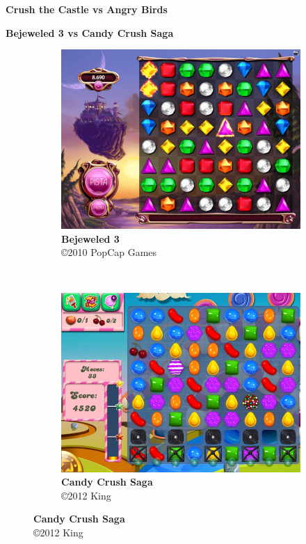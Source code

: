 \expandafter\documentclass\expandafter[table, usenames, svgnames, dvipsnames, \classopts]{beamer}
\begin{document}
\begin{frame}{\textbf{Crush the Castle vs Angry Birds}}

\end{frame}

\begin{frame}{\textbf{Bejeweled 3 vs Candy Crush Saga}}

	\begin{figure}
	    \centering

	    \begin{subfigure}[!h]{0.4\paperwidth}
	    	\centering
	    	\includegraphics[height=0.4\paperheight]{bejeweled-screenshot}
	        \caption{\scriptsize\textbf{Bejeweled 3}\\\copyright{2010} PopCap Games\footnotemark{}}
	    \end{subfigure}
	    ~
		\begin{subfigure}[!h]{0.4\paperwidth}
			\centering
	        \includegraphics[height=0.4\paperheight]{candy-crush-screenshot}
	        \caption{\scriptsize\textbf{Candy Crush Saga}\\\copyright{2012} King\footnotemark{}}
	    \end{subfigure}
    \end{figure}


\end{frame}
\end{document}
